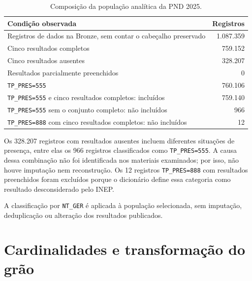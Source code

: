\begin{table}[H]
\centering
\scriptsize
\caption{Composição da população analítica da PND 2025.}
\label{tab:ap-populacao-pnd}
\renewcommand{\arraystretch}{1.15}
\begin{tabular}{|p{9.5cm}|r|}
\hline
\textbf{Condição observada} & \textbf{Registros} \\ \hline
Registros de dados na Bronze, sem contar o cabeçalho preservado & 1.087.359 \\ \hline
Cinco resultados completos & 759.152 \\ \hline
Cinco resultados ausentes & 328.207 \\ \hline
Resultados parcialmente preenchidos & 0 \\ \hline
\texttt{TP\_PRES=555} & 760.106 \\ \hline
\texttt{TP\_PRES=555} e cinco resultados completos: incluídos & 759.140 \\ \hline
\texttt{TP\_PRES=555} sem o conjunto completo: não incluídos & 966 \\ \hline
\texttt{TP\_PRES=888} com cinco resultados completos: não incluídos & 12 \\ \hline
\end{tabular}
\end{table}

Os 328.207 registros com resultados ausentes incluem diferentes situações de presença, entre elas os 966 registros classificados como \texttt{TP\_PRES=555}. A causa dessa combinação não foi identificada nos materiais examinados; por isso, não houve imputação nem reconstrução. Os 12 registros \texttt{TP\_PRES=888} com resultados preenchidos foram excluídos porque o dicionário define essa categoria como resultado desconsiderado pelo INEP.

A classificação por \texttt{NT\_GER} é aplicada à população selecionada, sem imputação, deduplicação ou alteração dos resultados publicados.

\section{Cardinalidades e transformação do grão}

